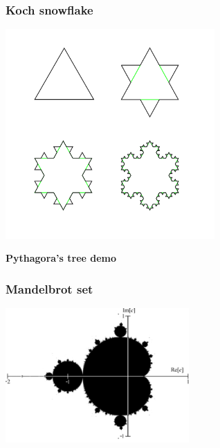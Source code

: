 \documentclass[9pt]{beamer}
\begin{document}
\begin{frame}
  \frametitle{Koch snowflake}

  \begin{center}
    \includegraphics[width = 8cm]{images/koch_building.png}
  \end{center}


\end{frame}

\begin{frame}
  \begin{center}
    {\Huge \bf{Pythagora's tree demo}}
  \end{center}
\end{frame}

\begin{frame}
  \frametitle{Mandelbrot set}

  \begin{center}
    \includegraphics[width = 7cm]{images/mandelbrot_simple.png}
  \end{center}
\end{frame}
\end{document}
